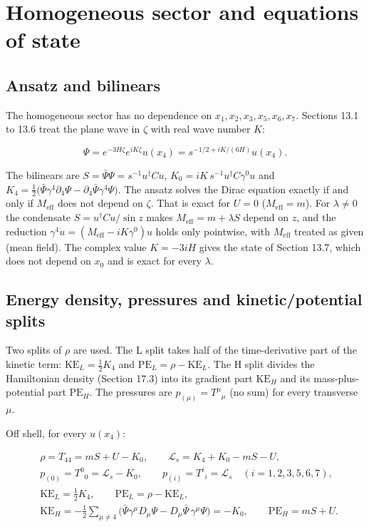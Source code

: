 \documentclass[11pt]{article}
\begin{document}
\section{Homogeneous sector and equations of state}

\subsection{Ansatz and bilinears}

The homogeneous sector has no dependence on $x_1,x_2,x_3,x_5,x_6,x_7$. Sections 13.1 to 13.6 treat the plane wave in $\zeta$ with real wave number $K$:

\[
\Psi=e^{-3H\zeta}e^{iK\zeta}u(x_4)=s^{-1/2+iK/(6H)}u(x_4).
\]

The bilinears are $S=\bar\Psi\Psi=s^{-1}u^\dagger Cu$, $K_0=iK\,s^{-1}u^\dagger C\gamma^0u$ and $K_4=\tfrac12\bigl(\bar\Psi\gamma^4\partial_4\Psi-\partial_4\bar\Psi\gamma^4\Psi\bigr)$. The ansatz solves the Dirac equation exactly if and only if $M_{\mathrm{eff}}$ does not depend on $\zeta$. That is exact for $U=0$ ($M_{\mathrm{eff}}=m$). For $\lambda\ne0$ the condensate $S=u^\dagger Cu/\sin z$ makes $M_{\mathrm{eff}}=m+\lambda S$ depend on $z$, and the reduction $\gamma^4\dot u=(M_{\mathrm{eff}}-iK\gamma^0)u$ holds only pointwise, with $M_{\mathrm{eff}}$ treated as given (mean field). The complex value $K=-3iH$ gives the state of Section 13.7, which does not depend on $x_0$ and is exact for every $\lambda$.

\subsection{Energy density, pressures and kinetic/potential splits}

Two splits of $\rho$ are used. The L split takes half of the time-derivative part of the kinetic term: $\mathrm{KE}_L=\tfrac12K_4$ and $\mathrm{PE}_L=\rho-\mathrm{KE}_L$. The H split divides the Hamiltonian density (Section 17.3) into its gradient part $\mathrm{KE}_H$ and its mass-plus-potential part $\mathrm{PE}_H$. The pressures are $p_{(\mu)}=T^\mu{}_\mu$ (no sum) for every transverse $\mu$.

Off shell, for every $u(x_4)$:

\[
\begin{aligned}
&\rho=T_{44}=mS+U-K_0,\qquad \mathcal L_s=K_4+K_0-mS-U,\\
&p_{(0)}=T^0{}_0=\mathcal L_s-K_0,\qquad p_{(i)}=T^i{}_i=\mathcal L_s\quad(i=1,2,3,5,6,7),\\
&\mathrm{KE}_L=\tfrac12K_4,\qquad \mathrm{PE}_L=\rho-\mathrm{KE}_L,\\
&\mathrm{KE}_H=-\tfrac12\sum_{\mu\ne4}\bigl(\bar\Psi\gamma^\mu D_\mu\Psi-D_\mu\bar\Psi\,\gamma^\mu\Psi\bigr)=-K_0,\qquad \mathrm{PE}_H=mS+U.
\end{aligned}
\]
\end{document}
